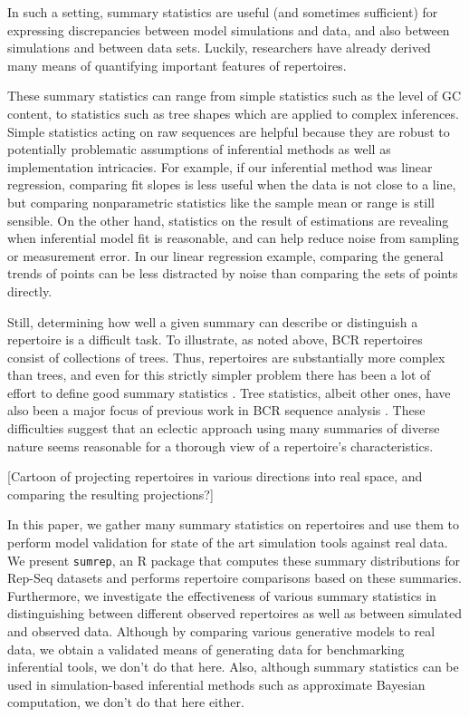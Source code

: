 \documentclass{article}
\begin{document}
In such a setting, summary statistics are useful (and sometimes sufficient) for expressing discrepancies between model simulations and data, and also between simulations and between data sets.
Luckily, researchers have already derived many means of quantifying important features of repertoires.

These summary statistics can range from simple statistics such as the level of GC content, to statistics such as tree shapes which are applied to complex inferences.
Simple statistics acting on raw sequences are helpful because they are robust to potentially problematic assumptions of inferential methods as well as implementation intricacies.
For example, if our inferential method was linear regression, comparing fit slopes is less useful when the data is not close to a line, but comparing nonparametric statistics like the sample mean or range is still sensible.
On the other hand, statistics on the result of estimations are revealing when inferential model fit is reasonable, and can help reduce noise from sampling or measurement error.
In our linear regression example, comparing the general trends of points can be less distracted by noise than comparing the sets of points directly.

Still, determining how well a given summary can describe or distinguish a repertoire is a difficult task.
To illustrate, as noted above, BCR repertoires consist of collections of trees.
Thus, repertoires are substantially more complex than trees, and even for this strictly simpler problem there has been a lot of effort to define good summary statistics \cite{Mooers1997-jl}.
Tree statistics, albeit other ones, have also been a major focus of previous work in BCR sequence analysis \cite{Dunn-Walters2004-hv,Mehr2004-ej,Steiman-Shimony2006-fm,Shahaf2008-cc}.
These difficulties suggest that an eclectic approach using many summaries of diverse nature seems reasonable for a thorough view of a repertoire's characteristics.

[Cartoon of projecting repertoires in various directions into real space, and comparing the resulting projections?]

In this paper, we gather many summary statistics on repertoires and use them to perform model validation for state of the art simulation tools against real data.
We present \texttt{sumrep}, an R package that computes these summary distributions for Rep-Seq datasets and performs repertoire comparisons based on these summaries.
Furthermore, we investigate the effectiveness of various summary statistics in distinguishing between different observed repertoires as well as between simulated and observed data.
Although by comparing various generative models to real data, we obtain a validated means of generating data for benchmarking inferential tools, we don't do that here.
Also, although summary statistics can be used in simulation-based inferential methods such as approximate Bayesian computation, we don't do that here either.
\end{document}
